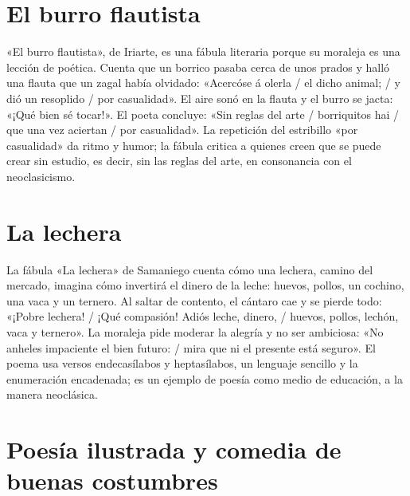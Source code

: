 \documentclass{book}
\begin{document}

\section{El burro flautista}

«El burro flautista», de Iriarte, es una fábula literaria porque su moraleja es una lección de poética. Cuenta que un borrico pasaba cerca de unos prados y halló una flauta que un zagal había olvidado: «Acercóse á olerla / el dicho animal; / y dió un resoplido / por casualidad». El aire sonó en la flauta y el burro se jacta: «¡Qué bien sé tocar!». El poeta concluye: «Sin reglas del arte / borriquitos hai / que una vez aciertan / por casualidad». La repetición del estribillo «por casualidad» da ritmo y humor; la fábula critica a quienes creen que se puede crear sin estudio, es decir, sin las reglas del arte, en consonancia con el neoclasicismo.


\section{La lechera}

La fábula «La lechera» de Samaniego cuenta cómo una lechera, camino del mercado, imagina cómo invertirá el dinero de la leche: huevos, pollos, un cochino, una vaca y un ternero. Al saltar de contento, el cántaro cae y se pierde todo: «¡Pobre lechera! / ¡Qué compasión! Adiós leche, dinero, / huevos, pollos, lechón, vaca y ternero». La moraleja pide moderar la alegría y no ser ambiciosa: «No anheles impaciente el bien futuro: / mira que ni el presente está seguro». El poema usa versos endecasílabos y heptasílabos, un lenguaje sencillo y la enumeración encadenada; es un ejemplo de poesía como medio de educación, a la manera neoclásica.


\section{Poesía ilustrada y comedia de buenas costumbres}
\end{document}

